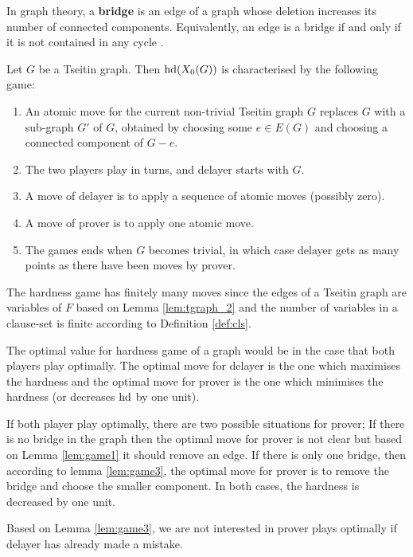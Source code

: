 \documentclass[12pt]{book}
\begin{document}
\begin{defi}\label{def:bridge}
      In graph theory, a \textbf{bridge} is an edge of a graph whose deletion increases its number of connected components. Equivalently, 
	  an edge is a bridge if and only if it is not contained in any cycle \cite{h15}.  
\end{defi}

\begin{lem}\label{lem:game1}
      Let $G$ be a Tseitin graph. Then $\operatorname{hd}(X_0(G))$ is characterised by the following game:
	  \begin{enumerate}
	  \item An atomic move for the current non-trivial Tseitin graph $G$ replaces $G$ with a sub-graph $G'$ of $G$, obtained by choosing 
	  some $e \in E(G)$ and choosing a connected component of $G - e$.
	  \item The two players play in turns, and delayer starts with $G$.
	  \item A move of delayer is to apply a sequence of atomic moves (possibly zero).
	  \item A move of prover is to apply one atomic move.
	  \item The games ends when $G$ becomes trivial, in which case delayer gets as many points as there have been moves by prover.
	  \end{enumerate}
\end{lem} 
\begin{lem}\label{lem:game2}
      The hardness game has finitely many moves since the edges of a Tseitin graph are variables of $F$ based on Lemma \ref{lem:tgraph_2} and 
	  the number of variables in a clause-set is finite according to Definition \ref{def:cls}.
\end{lem}
\begin{lem}\label{lem:game3}
      The optimal value for hardness game of a graph would be in the case that both players play optimally. The optimal move for delayer 
	  is the one which maximises the hardness and the optimal move for prover is the one which minimises the hardness (or decreases $\operatorname{hd}$ by one unit).
\end{lem}
\begin{lem}\label{lem:game6}
      If both player play optimally, there are two possible situations for prover; If there is no bridge in the graph then the optimal move for 
	  prover is not clear but based on Lemma \ref{lem:game1} it should remove an edge. If there is only one bridge, then according to lemma 
	  \ref{lem:game3}, the optimal move for prover is to remove the bridge and choose the smaller component. In both cases, the hardness is 
	  decreased by one unit. 
\end{lem}
\begin{lem}\label{lem:game4}
      Based on Lemma \ref{lem:game3}, we are not interested in prover plays optimally if delayer has already made a mistake.
\end{lem}
\end{document}
